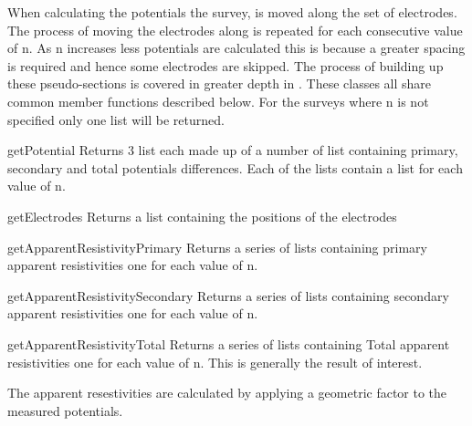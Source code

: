 When calculating the potentials the survey, is moved along the set of electrodes.
The process of moving the electrodes along is repeated for each consecutive value of n.
As n increases less potentials are calculated this is because a greater spacing is
required and hence some electrodes are skipped. The process of building up these
pseudo-sections is covered in greater depth in \cite[pg 19]{LOKE2014}.
These classes all share common member functions described below. For the surveys
where n is not specified only one list will be returned. 

\begin{methoddesc}[]{getPotential}{}
Returns 3 list each made up of a number of list containing primary, secondary and total
potentials differences. Each of the lists contain a list for each value of n.
\end{methoddesc}

\begin{methoddesc}[]{getElectrodes}{}
Returns a list containing the positions of the electrodes
\end{methoddesc}

\begin{methoddesc}[]{getApparentResistivityPrimary}{}
Returns a series of lists containing primary apparent resistivities one for each 
value of n.
\end{methoddesc}

\begin{methoddesc}[]{getApparentResistivitySecondary}{}
Returns a series of lists containing secondary apparent resistivities one for each 
value of n.
\end{methoddesc}

\begin{methoddesc}[]{getApparentResistivityTotal}{}
Returns a series of lists containing Total apparent resistivities one for each 
value of n. This is generally the result of interest.
\end{methoddesc}

The apparent resestivities are calculated by applying a geometric factor to the
measured potentials.